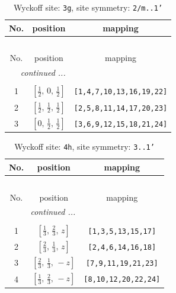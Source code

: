 \documentclass[fleqn,8pt]{jsarticle}
\begin{document}
\begin{longtable}{ccc}
\caption{Wyckoff site: {\tt 3g}, site symmetry: {\tt 2/m..1'}}
 \\
 \hline \hline
No. & position & mapping \\ \hline \endfirsthead

\multicolumn{2}{l}{\tablename\ \thetable{}} \\
 \hline \hline
No. & position & mapping \\ \hline \endhead

 \hline \hline
\multicolumn{2}{r}{\footnotesize\it continued ...} \\ \endfoot

 \hline \hline
\multicolumn{2}{r}{} \\ \endlastfoot

1 & $\left[ \frac{1}{2},\, 0,\, \frac{1}{2} \right]$ & {\tt [1,4,7,10,13,16,19,22]} \\ \hline
2 & $\left[ \frac{1}{2},\, \frac{1}{2},\, \frac{1}{2} \right]$ & {\tt [2,5,8,11,14,17,20,23]} \\ \hline
3 & $\left[ 0,\, \frac{1}{2},\, \frac{1}{2} \right]$ & {\tt [3,6,9,12,15,18,21,24]} \\
\end{longtable}
\renewcommand{\arraystretch}{1.2}
\begin{longtable}{ccc}
\caption{Wyckoff site: {\tt 4h}, site symmetry: {\tt 3..1'}}
 \\
 \hline \hline
No. & position & mapping \\ \hline \endfirsthead

\multicolumn{2}{l}{\tablename\ \thetable{}} \\
 \hline \hline
No. & position & mapping \\ \hline \endhead

 \hline \hline
\multicolumn{2}{r}{\footnotesize\it continued ...} \\ \endfoot

 \hline \hline
\multicolumn{2}{r}{} \\ \endlastfoot

1 & $\left[ \frac{1}{3},\, \frac{2}{3},\, z \right]$ & {\tt [1,3,5,13,15,17]} \\ \hline
2 & $\left[ \frac{2}{3},\, \frac{1}{3},\, z \right]$ & {\tt [2,4,6,14,16,18]} \\ \hline
3 & $\left[ \frac{2}{3},\, \frac{1}{3},\, - z \right]$ & {\tt [7,9,11,19,21,23]} \\ \hline
4 & $\left[ \frac{1}{3},\, \frac{2}{3},\, - z \right]$ & {\tt [8,10,12,20,22,24]} \\
\end{longtable}
\end{document}
